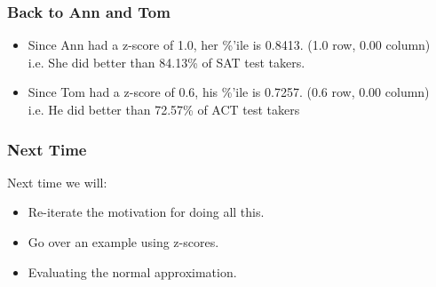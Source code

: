 \documentclass[slides]{beamer}
\begin{document}
\begin{frame}
\frametitle{Back to Ann and Tom}

\begin{itemize}
\item Since Ann had a z-score of 1.0, her \%'ile is 0.8413. (1.0 row, 0.00 column)\\
i.e. She did better than 84.13\% of SAT test takers.
\pause \item Since Tom had a z-score of 0.6, his \%'ile is 0.7257. (0.6 row, 0.00 column)\\
i.e. He did better than 72.57\% of ACT test takers
\end{itemize}


\end{frame}





\begin{frame}[fragile]
\frametitle{Next Time}

Next time we will:

\begin{itemize}
\item Re-iterate the motivation for doing all this.
\item Go over an example using z-scores.
\item Evaluating the normal approximation.
\end{itemize}


\end{frame}
\end{document}
